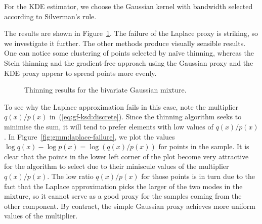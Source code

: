 \documentclass[11pt,a4paper]{report}
\begin{document}
For the KDE estimator, we choose the Gaussian kernel with bandwidth selected according to Silverman's rule.

The results are shown in Figure~\ref{fig:gmm:thinned}. The failure of the Laplace proxy is striking, so we investigate it further. The other methods produce visually sensible results. One can notice some clustering of points selected by na\"ive thinning, whereas the Stein thinning and the gradient-free approach using the Gaussian proxy and the KDE proxy appear to spread points more evenly.

\begin{figure}[h!]
\centering
{}
\caption{Thinning results for the bivariate Gaussian mixture.
\label{fig:gmm:thinned}}
\end{figure}

To see why the Laplace approximation fails in this case, note the multiplier $q(x) / p(x)$ in~(\ref{eq:gf-ksd:discrete}). Since the thinning algorithm seeks to minimise the sum, it will tend to prefer elements with low values of $q(x) / p(x)$. In Figure~\ref{fig:gmm:laplace-failure}, we plot the values $\log q(x) - \log p(x) = \log (q(x) / p(x))$ for points in the sample. It is clear that the points in the lower left corner of the plot become very attractive for the algorithm to select due to their miniscule values of the multiplier $q(x) / p(x)$. The low ratio $q(x) / p(x)$ for those points is in turn due to the fact that the Laplace approximation picks the larger of the two modes in the mixture, so it cannot serve as a good proxy for the samples coming from the other component. By contract, the simple Gaussian proxy achieves more uniform values of the multiplier.
\end{document}
